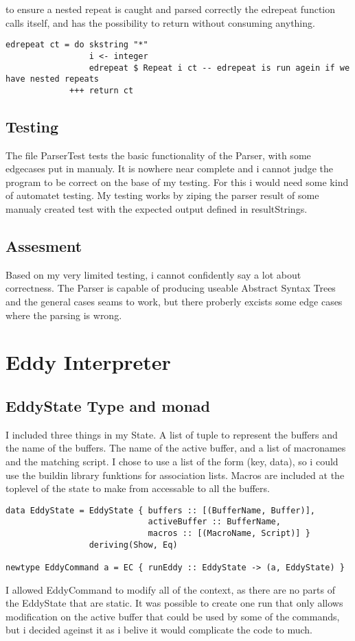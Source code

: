 \documentclass{article}
\begin{document}
to ensure a nested repeat is caught and parsed correctly the
edrepeat function calls itself, and has the possibility to return
without consuming anything.
\begin{verbatim}
edrepeat ct = do skstring "*"
                 i <- integer
                 edrepeat $ Repeat i ct -- edrepeat is run agein if we have nested repeats
             +++ return ct
\end{verbatim}

\subsection{Testing}
   
The file ParserTest tests the basic functionality of the Parser, with some edgecases put in manualy.
It is nowhere near complete and i cannot judge the program to be correct on the base of my testing.
For this i would need some kind of automatet testing. My testing
works by ziping the parser result of some manualy created test with
the expected output defined in resultStrings.
   

\subsection{Assesment}

Based on my very limited testing, i cannot confidently say a lot about
correctness.
The Parser is capable of producing useable Abstract
Syntax Trees and the general cases seams to work, but there 
proberly excists some edge cases where the parsing is wrong.


\section{Eddy Interpreter}

\subsection{EddyState Type and monad}

I included three things in my State. A list of tuple to represent
the buffers and the name of the buffers. The name of the active
buffer, and a list of macronames and the matching script.
I chose to use a list of the form (key, data), so i could use 
the buildin library funktions for association lists. Macros
are included at the toplevel of the state to make from accessable
to all the buffers.
\begin{verbatim}
data EddyState = EddyState { buffers :: [(BufferName, Buffer)],
                             activeBuffer :: BufferName,
                             macros :: [(MacroName, Script)] }
                 deriving(Show, Eq)

newtype EddyCommand a = EC { runEddy :: EddyState -> (a, EddyState) }
\end{verbatim}
I allowed EddyCommand to modify all of the context, as
there are no parts of the EddyState that are static. It was possible
to create one run that only allows modification on the active buffer
that could be used by some of the commands, but i decided ageinst it 
as i belive it would complicate the code to much.
\end{document}
